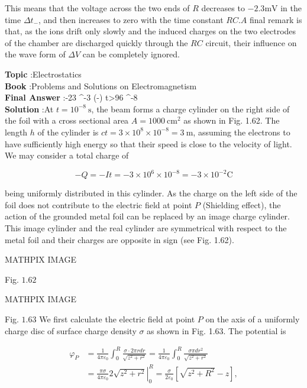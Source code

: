 \documentclass[10pt]{article}
\begin{document}
This means that the voltage across the two ends of $R$ decreases to $-2.3 \mathrm{mV}$ in the time $\Delta t_{-}$, and then increases to zero with the time constant $R C . A$ final remark is that, as the ions drift only slowly and the induced charges on the two electrodes of the chamber are discharged quickly through the $R C$ circuit, their influence on the wave form of $\Delta V$ can be completely ignored.

\textbf{Topic} :Electrostatics\\
\textbf{Book} :Problems and Solutions on Electromagnetism\\
\textbf{Final Answer} :-23 ^{-3} \exp \left(-\right)  \quad {} \quad t>96 ^{-8} \\


\textbf{Solution} :At $t=10^{-8} \mathrm{~s}$, the beam forms a charge cylinder on the right side of the foil with a cross sectional area $A=1000 \mathrm{~cm}^{2}$ as shown in Fig. 1.62. The length $h$ of the cylinder is $c t=3 \times 10^{8} \times 10^{-8}=3 \mathrm{~m}$, assuming the electrons to have sufficiently high energy so that their speed is close to the velocity of light. We may consider a total charge of

$$
-Q=-I t=-3 \times 10^{6} \times 10^{-8}=-3 \times 10^{-2} \mathrm{C}
$$

being uniformly distributed in this cylinder. As the charge on the left side of the foil does not contribute to the electric field at point $P$ (Shielding effect), the action of the grounded metal foil can be replaced by an image charge cylinder. This image cylinder and the real cylinder are symmetrical with respect to the metal foil and their charges are opposite in sign (see Fig. 1.62).

MATHPIX IMAGE

Fig. $1.62$

MATHPIX IMAGE

Fig. $1.63$ We first calculate the electric field at point $P$ on the axis of a uniformly charge disc of surface charge density $\sigma$ as shown in Fig. 1.63. The potential is

$$
\begin{aligned}
\varphi_{P} &=\frac{1}{4 \pi \varepsilon_{0}} \int_{0}^{R} \frac{\sigma \cdot 2 \pi r d r}{\sqrt{z^{2}+r^{2}}}=\frac{1}{4 \pi \varepsilon_{0}} \int_{0}^{R} \frac{\sigma \pi d r^{2}}{\sqrt{z^{2}+r^{2}}} \\
&=\left.\frac{\pi \sigma}{4 \pi \varepsilon_{0}} 2 \sqrt{z^{2}+r^{2}}\right|_{0} ^{R}=\frac{\sigma}{2 \varepsilon_{0}}\left[\sqrt{z^{2}+R^{2}}-z\right],
\end{aligned}
$$
\end{document}
